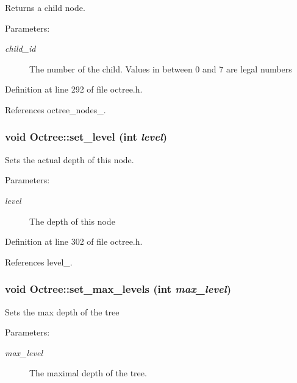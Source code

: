 Returns a child node.

\begin{Desc}
\item[Parameters:]
\begin{description}
\item[{\em child\_\-id}]The number of the child. Values in between 0 and 7 are legal numbers \end{description}
\end{Desc}


Definition at line 292 of file octree.h.

References octree\_\-nodes\_\-.\hypertarget{class_octree_3456b71a9ff5067eed4317fe10947fcf}{
\subsubsection[set\_\-level]{\setlength{\rightskip}{0pt plus 5cm}void Octree::set\_\-level (int {\em level})}}
\label{class_octree_3456b71a9ff5067eed4317fe10947fcf}


Sets the actual depth of this node. \begin{Desc}
\item[Parameters:]
\begin{description}
\item[{\em level}]The depth of this node \end{description}
\end{Desc}


Definition at line 302 of file octree.h.

References level\_\-.\hypertarget{class_octree_eb0215c31bf2b52267e0252940812680}{
\subsubsection[set\_\-max\_\-levels]{\setlength{\rightskip}{0pt plus 5cm}void Octree::set\_\-max\_\-levels (int {\em max\_\-level})}}
\label{class_octree_eb0215c31bf2b52267e0252940812680}


Sets the max depth of the tree \begin{Desc}
\item[Parameters:]
\begin{description}
\item[{\em max\_\-level}]The maximal depth of the tree. \end{description}
\end{Desc}


